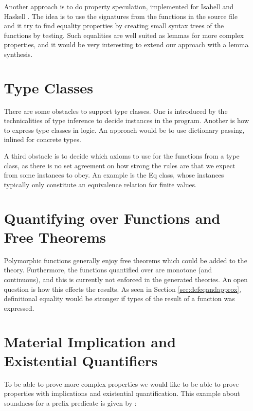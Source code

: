 Another approach is to do property speculation, implemented for
Isabell \citep{isacosy} and Haskell \citep{quickspec}. The idea is to
use the signatures from the functions in the source file and it try to
find equality properties by creating small syntax trees of the
functions by testing. Such equalities are well suited as lemmas for
more complex properties, and it would be very interesting to extend
our approach with a lemma synthesis.


\section{Type Classes}
\label{sec:typeclasses}

There are some obstacles to support type classes. One is introduced by
the technicalities of type inference to decide instances in the
program. Another is how to express type classes in logic. An approach
would be to use dictionary passing, inlined for concrete types.

A third obstacle is to decide which axioms to use for the functions
from a type class, as there is no set agreement on how strong the
rules are that we expect from some instances to obey. An example
is the Eq class, whose instances typically only constitute an
equivalence relation for finite values.

\section{Quantifying over Functions and Free Theorems}

Polymorphic functions generally enjoy free theorems
\citep{freetheorems} which could be added to the theory.  Furthermore,
the functions quantified over are monotone (and continuous), and this
is currently not enforced in the generated theories. An open question
is how this effects the results. As seen in Section
\ref{sec:defeqandapprox}, definitional equality would be stronger if
types of the result of a function was expressed.


\section{Material Implication and Existential Quantifiers}

To be able to prove more complex properties we would like to be able
to prove properties with implications and existential quantification.
This example about soundness for a prefix predicate is given by
\cite{smallcheck}:

